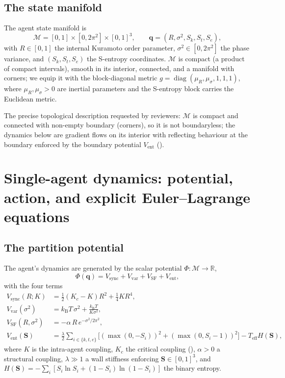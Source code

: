 \documentclass[11pt,twocolumn,a4paper]{article}
\newcommand{\R}{\mathbb{R}}
\newcommand{\M}{\mathcal{M}}
\newcommand{\Sk}{S_k}
\newcommand{\St}{S_t}
\newcommand{\Se}{S_e}
\newcommand{\Svec}{\mathbf{S}}
\newcommand{\qvec}{\mathbf{q}}
\newcommand{\Pot}{\Phi}
\newcommand{\kB}{k_{\mathrm{B}}}
\newcommand{\Kc}{K_c}
\newcommand{\Ord}{R}
\begin{document}
\subsection{The state manifold}

\begin{definition}\label{def:manifold}
The agent state manifold is
\[
\M=[0,1]\times[0,2\pi^2]\times[0,1]^3,\qquad
\qvec=(\Ord,\sigma^2,\Sk,\St,\Se),
\]
with $\Ord\in[0,1]$ the internal Kuramoto order parameter, $\sigma^2\in
[0,2\pi^2]$ the phase variance, and $(\Sk,\St,\Se)$ the S-entropy coordinates.
$\M$ is compact (a product of compact intervals), smooth in its interior,
connected, and a manifold with corners; we equip it with the block-diagonal
metric $g=\operatorname{diag}(\mu_R,\mu_\sigma,1,1,1)$, where $\mu_R,\mu_\sigma>0$
are inertial parameters and the S-entropy block carries the Euclidean metric.
\end{definition}

\begin{remark}
The precise topological description requested by reviewers: $\M$ is compact and
connected with non-empty boundary (corners), so it is not boundaryless; the
dynamics below are gradient flows on its interior with reflecting behaviour at
the boundary enforced by the boundary potential $V_{\mathrm{ent}}$
().
\end{remark}



\section{Single-agent dynamics: potential, action, and explicit
Euler--Lagrange equations}
\label{sec:dynamics}

\subsection{The partition potential}

\begin{definition}\label{def:potential}
The agent's dynamics are generated by the scalar potential
$\Pot:\M\to\R$,
\[
\Pot(\qvec)=V_{\mathrm{sync}}+V_{\mathrm{var}}+V_{\mathrm{SF}}+V_{\mathrm{ent}},
\]
with the four terms
\begin{align}
V_{\mathrm{sync}}(\Ord;K)&=\tfrac12(\Kc-K)\Ord^2+\tfrac14 K\Ord^4,\\
V_{\mathrm{var}}(\sigma^2)&=\kB T\,\sigma^2+\frac{\kB T}{K\sigma^2},\\
V_{\mathrm{SF}}(\Ord,\sigma^2)&=-\alpha\,\Ord\,e^{-\sigma^2/2\pi^2},\\
V_{\mathrm{ent}}(\Svec)&=\frac{\lambda}{2}\!\sum_{i\in\{k,t,e\}}\!\!\big[
(\max(0,-S_i))^2+(\max(0,S_i-1))^2\big]-T_{\mathrm{eff}}H(\Svec),
\end{align}
where $K$ is the intra-agent coupling, $\Kc$ the critical coupling
(), $\alpha>0$ a structural coupling, $\lambda\gg1$ a wall
stiffness enforcing $\Svec\in[0,1]^3$, and $H(\Svec)=-\sum_i[S_i\ln S_i+
(1-S_i)\ln(1-S_i)]$ the binary entropy.
\end{definition}
\end{document}
